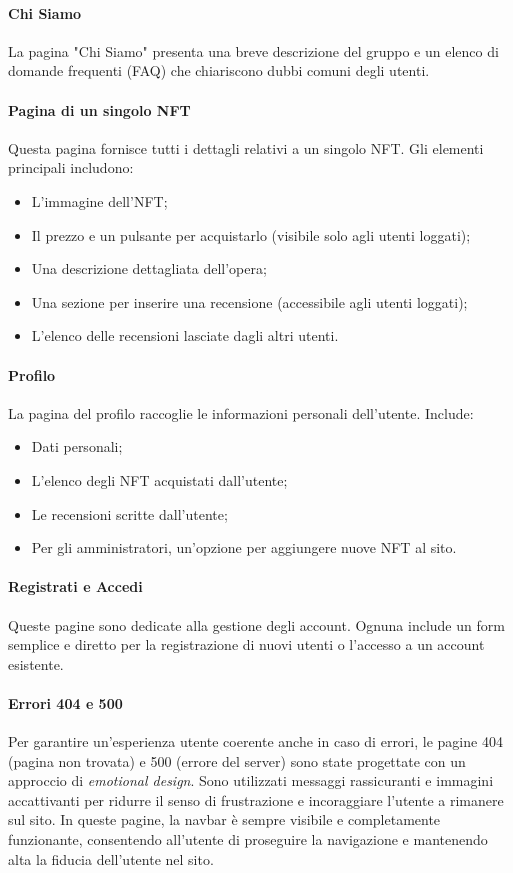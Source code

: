 \documentclass[10pt]{article}
\begin{document}
\paragraph{Chi Siamo} La pagina "Chi Siamo" presenta una breve descrizione del gruppo e un elenco di domande frequenti (FAQ) che chiariscono dubbi comuni degli utenti.

\paragraph{Pagina di un singolo NFT} Questa pagina fornisce tutti i dettagli relativi a un singolo NFT. Gli elementi principali includono: \begin{itemize} \item L’immagine dell’NFT; \item Il prezzo e un pulsante per acquistarlo (visibile solo agli utenti loggati); \item Una descrizione dettagliata dell’opera; \item Una sezione per inserire una recensione (accessibile agli utenti loggati); \item L’elenco delle recensioni lasciate dagli altri utenti. \end{itemize}

\paragraph{Profilo} La pagina del profilo raccoglie le informazioni personali dell’utente. Include: \begin{itemize} \item Dati personali; \item L’elenco degli NFT acquistati dall’utente; \item Le recensioni scritte dall’utente; \item Per gli amministratori, un’opzione per aggiungere nuove NFT al sito. \end{itemize}

\paragraph{Registrati e Accedi} Queste pagine sono dedicate alla gestione degli account. Ognuna include un form semplice e diretto per la registrazione di nuovi utenti o l’accesso a un account esistente.

\paragraph{Errori 404 e 500} Per garantire un’esperienza utente coerente anche in caso di errori, le pagine 404 (pagina non trovata) e 500 (errore del server) sono state progettate con un approccio di \textit{emotional design}. Sono utilizzati messaggi rassicuranti e immagini accattivanti per ridurre il senso di frustrazione e incoraggiare l’utente a rimanere sul sito. In queste pagine, la navbar è sempre visibile e completamente funzionante, consentendo all’utente di proseguire la navigazione e mantenendo alta la fiducia dell’utente nel sito.
\end{document}
